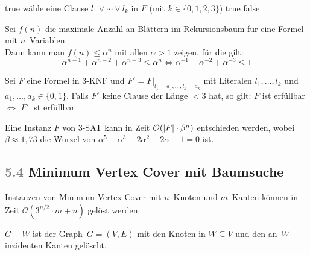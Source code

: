 \documentclass{cheat-sheet}
\newcommand{\size}[1]{\abs{#1}} %
\renewcommand{\O}{\mathcal{O}} %
\newcommand{\Problem}[1]{\textcolor{ProblemColor}{\textbf{#1}}}
\newcommand{\scriptSection}[1]{\textcolor{gray}{#1}\enspace}
\begin{document}
\begin{algorithmic}
      \Return true
    \EndIf
    \State wähle eine Clause $l_1 \vee \cdots \vee l_k$ in $F$ (mit $k \in \{ 0, 1, 2, 3 \}$)
        \Return true
      \EndIf
    \EndFor
    \State \Return false
  \EndFunction
\end{algorithmic}

\begin{beweisskizze}
  Sei $f(n)$ die maximale Anzahl an Blättern im Rekursionsbaum für eine Formel mit $n$~Variablen. \\
  Dann kann man $f(n) \leq \alpha^n$ mit allen $\alpha > 1$ zeigen, für die gilt:
  \[
    \alpha^{n-1} + \alpha^{n-2} + \alpha^{n-3} \leq \alpha^n \iff
    \alpha^{-1} + \alpha^{-2} + \alpha^{-3} \leq 1
  \]
\end{beweisskizze}

\begin{lem}
  Sei $F$ eine Formel in 3-KNF und $F' = F|_{l_1=a_1, \ldots, l_k=a_k}$ mit Literalen $l_1, \ldots, l_k$ und $a_1, \ldots, a_k \in \{ 0, 1 \}$.
  Falls $F'$ keine Clause der Länge $< 3$ hat, so gilt: $F$ ist erfüllbar $\iff$ $F'$ ist erfüllbar
\end{lem}

\begin{satz}
  Eine Instanz $F$ von 3-SAT kann in Zeit $\O(\size{F} \cdot \beta^n)$ entschieden werden, wobei $\beta \approx 1,73$ die Wurzel von $\alpha^5 - \alpha^3 - 2 \alpha^2  - 2 \alpha - 1 = 0$ ist.
\end{satz}

\subsection{\scriptSection{5.4} \Problem{Minimum Vertex Cover} mit Baumsuche}

\begin{satz}
  Instanzen von Minimum Vertex Cover mit $n$~Knoten und $m$~Kanten können in Zeit $\O(3^{n/2} \cdot m + n)$ gelöst werden.
\end{satz}

\begin{nota}
  $G - W$ ist der Graph~$G = (V, E)$ mit den Knoten in $W \subseteq V$ und den an~$W$ inzidenten Kanten gelöscht.
\end{nota}
\end{document}
